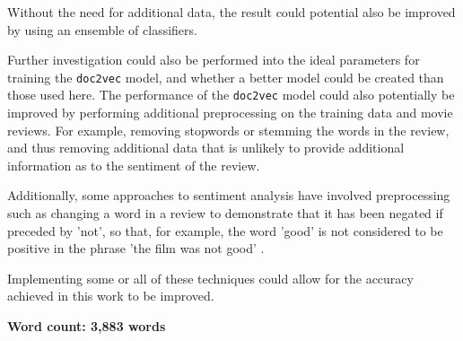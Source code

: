 \documentclass[twocolumn]{article}
\begin{document}
Without the need for additional data, the result could potential also be improved by using an ensemble of classifiers.

Further investigation could also be performed into the ideal parameters for training the \texttt{doc2vec} model, and whether a better model could be created than those used here. The performance of the \texttt{doc2vec} model could also potentially be improved by performing additional preprocessing on the training data and movie reviews. For example, removing stopwords or stemming the words in the review, and thus removing additional data that is unlikely to provide additional information as to the sentiment of the review.

Additionally, some approaches to sentiment analysis have involved preprocessing such as changing a word in a review to demonstrate that it has been negated if preceded by 'not', so that, for example, the word 'good' is not considered to be positive in the phrase 'the film was not good' \cite{pang}.

Implementing some or all of these techniques could allow for the accuracy achieved in this work to be improved.


\textbf{Word count: 3,883 words}

{}

\end{document}
